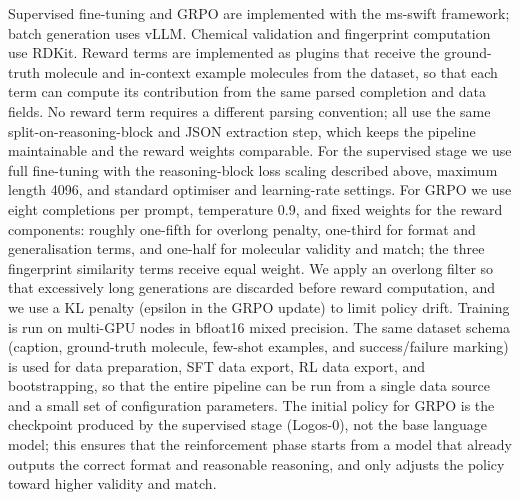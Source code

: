 \documentclass[11pt]{article}
\begin{document}
Supervised fine-tuning and GRPO are implemented with the ms-swift framework; batch generation uses vLLM. Chemical validation and fingerprint computation use RDKit\cite{rdkit}. Reward terms are implemented as plugins that receive the ground-truth molecule and in-context example molecules from the dataset, so that each term can compute its contribution from the same parsed completion and data fields. No reward term requires a different parsing convention; all use the same split-on-reasoning-block and JSON extraction step, which keeps the pipeline maintainable and the reward weights comparable. For the supervised stage we use full fine-tuning with the reasoning-block loss scaling described above, maximum length 4096, and standard optimiser and learning-rate settings. For GRPO we use eight completions per prompt, temperature 0.9, and fixed weights for the reward components: roughly one-fifth for overlong penalty, one-third for format and generalisation terms, and one-half for molecular validity and match; the three fingerprint similarity terms receive equal weight. We apply an overlong filter so that excessively long generations are discarded before reward computation, and we use a KL penalty (epsilon in the GRPO update) to limit policy drift. Training is run on multi-GPU nodes in bfloat16 mixed precision. The same dataset schema (caption, ground-truth molecule, few-shot examples, and success/failure marking) is used for data preparation, SFT data export, RL data export, and bootstrapping, so that the entire pipeline can be run from a single data source and a small set of configuration parameters. The initial policy for GRPO is the checkpoint produced by the supervised stage (Logos-0), not the base language model; this ensures that the reinforcement phase starts from a model that already outputs the correct format and reasonable reasoning, and only adjusts the policy toward higher validity and match.




\end{document}

